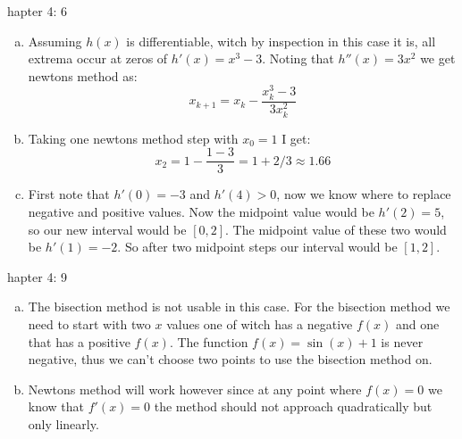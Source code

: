 \documentclass[12pt]{article}
\makeatletter
\theoremstyle{homework}
\newenvironment{exercise}[1]
{\def\@currentlabel{#1}\exercisecore}
{\endexercisecore}
\makeatother
\begin{document}
\begin{exercise}

Chapter 4: 6
\end{exercise}
\begin{enumerate}[(a)]

\item
Assuming $h(x)$ is differentiable, witch by inspection in this case it is, all extrema occur at zeros of $h'(x)=x^3-3$.  Noting that $h''(x)=3x^2$ we get newtons method as: $$x_{k+1}=x_k-\frac{x_k^3-3}{3x_k^2}$$

\item
Taking one newtons method step with $x_0=1$ I get:
$$x_{2}=1-\frac{1-3}{3}=1+2/3\approx 1.66$$

\item
First note that $h'(0)=-3$ and $h'(4)>0$, now we know where to replace negative and positive values.  Now the midpoint value would be $h'(2)=5$, so our new interval would be $[0,2]$.  The midpoint value of these two would be $h'(1)=-2$.  So after two midpoint steps our interval would be $[1,2]$.

\end{enumerate}

\begin{exercise}

Chapter 4: 9
\end{exercise}
\begin{enumerate}[(a)]
\item
The bisection method is not usable in this case. For the bisection method we need to start with two $x$ values one of witch has a negative $f(x)$ and one that has a positive $f(x)$.  The function $f(x)=\sin (x)+1$ is never negative, thus we can't choose two points to use the bisection method on.

\item
Newtons method will work however since at any point where $f(x)=0$ we know that $f'(x)=0$ the method should not approach quadratically but only linearly.
\end{enumerate}
\end{document}
